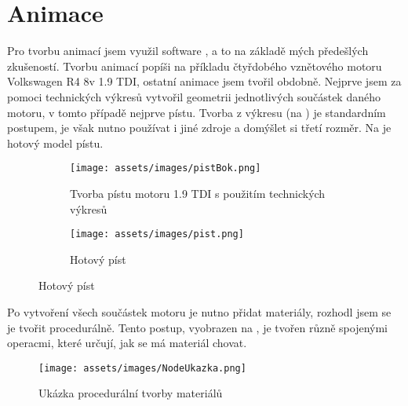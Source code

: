 \section{Animace}\label{sc:animace}
{Pro tvorbu animací jsem využil software , a to na základě mých předešlých zkušeností. Tvorbu animací popíši na příkladu čtyřdobého vznětového motoru Volkswagen R4 8v 1.9 TDI, ostatní animace jsem tvořil obdobně.}\odst
{Nejprve jsem za pomoci technických výkresů vytvořil geometrii jednotlivých součástek daného motoru, v tomto případě nejprve pístu. Tvorba z výkresu (na ) je standardním postupem, je však nutno používat i jiné zdroje a domýšlet si třetí rozměr. Na  je hotový model pístu.}
\begin{figure}[H]
    \centering
    \begingroup
    \makeatletter
    \renewcommand\thesubfigure{\thefigure~--~\@nameuse{subfiglabel@\alph{subfigure}}}
    \newcommand{\subfiglabel@a}{vlevo}
    \newcommand{\subfiglabel@b}{vpravo}
    \captionsetup[subfigure]{labelformat=simple, labelsep=colon}
    \renewcommand\p@subfigure{}
    \makeatother
    \begin{subfigure}{.5\textwidth}
        \centering
        \texttt{[image: assets/images/pistBok.png]}
        \caption{Tvorba pístu motoru 1.9 TDI s použitím technických výkresů \jaObr}
        \label{obr:pistVykresy}
    \end{subfigure}%
    \begin{subfigure}{.5\textwidth}
        \centering
        \texttt{[image: assets/images/pist.png]}
        \caption{Hotový píst \jaObr}
        \label{obr:pistHotovy}
    \end{subfigure}
    \endgroup
\end{figure}
{Po vytvoření všech součástek motoru je nutno přidat materiály, rozhodl jsem se je tvořit procedurálně. Tento postup, vyobrazen na , je tvořen různě spojenými operacmi, které určují, jak se má materiál chovat.}
\begin{figure}[H]
    \centering
    \texttt{[image: assets/images/NodeUkazka.png]}
    \caption{Ukázka procedurální tvorby materiálů \jaObr}
    \label{obr:NodeUkazka}
\end{figure}

